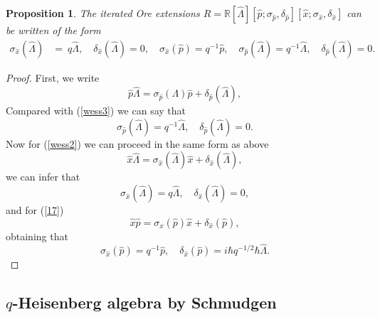 \documentclass[12pt,a4paper]{article}
\theoremstyle{plain}
\newtheorem{proposition}[theorem]{Proposition}
\theoremstyle{definition}
\theoremstyle{remark}
\begin{document}
\begin{proposition}\label{Rings-wess}
The iterated Ore extensions $R=\mathbb{R}[\hat{\Lambda}][\hat{p};\sigma_{\hat{p}},\delta_{\hat{p}}][\hat{x};\sigma_{\hat{x}},\delta_{\hat{x}}]$ can be written of the form
\begin{align*}
    \sigma_{\hat{x}}(\hat{\Lambda}) & = \ q\hat{\Lambda}, \quad \delta_{\hat{x}}(\hat{\Lambda})=0, \quad \sigma_{\hat{x}}(\hat{p})=q^{-1}\hat{p}, \quad \sigma_{\hat{p}}(\hat{\Lambda})=q^{-1}\hat{\Lambda}, \quad \delta_{\hat{p}}(\hat{\Lambda})=0.
\end{align*}
\end{proposition}
\begin{proof}
   First, we write 
   \begin{equation*}
       \hat{p}\hat{\Lambda}=\sigma_{\hat{p}}(\Lambda)\hat{p}+\delta_{\hat{p}}(\hat{\Lambda}), 
   \end{equation*}
   Compared with (\ref{wess3}) we can say that
   \begin{equation*}
    \sigma_{\hat{p}}(\hat{\Lambda})=q^{-1}\hat{\Lambda}, \quad \delta_{\hat{p}}(\hat{\Lambda})=0.
   \end{equation*}
   Now for (\ref{wess2}) we can proceed in the same form as above
   \begin{equation*}
       \hat{x}\hat{\Lambda}=\sigma_{\hat{x}}(\hat{\Lambda})\hat{x}+\delta_{\hat{x}}(\hat{\Lambda}),
   \end{equation*}
   we can infer that 
   \begin{equation*}
       \sigma_{\hat{x}}(\hat{\Lambda})=q\hat{\Lambda}, \quad \delta_{\hat{x}}(\hat{\Lambda})=0,
   \end{equation*}
   and for (\ref{17})
   \begin{equation*}
       \hat{x}\hat{p} = \sigma_{x}(\hat{p})\hat{x}+\delta_{\hat{x}}(\hat{p}),
   \end{equation*}
   obtaining that
   \begin{equation*}
     \sigma_{\hat{x}}(\hat{p})=q^{-1}\hat{p}, \quad \delta_{\hat{x}}(\hat{p})=i\hbar q^{-1/2}\hbar\hat{\Lambda}.
   \end{equation*}  
\end{proof}


\subsection{\texorpdfstring{$q$}{Lg}-Heisenberg algebra by Schmudgen}\label{rem2}
\end{document}

